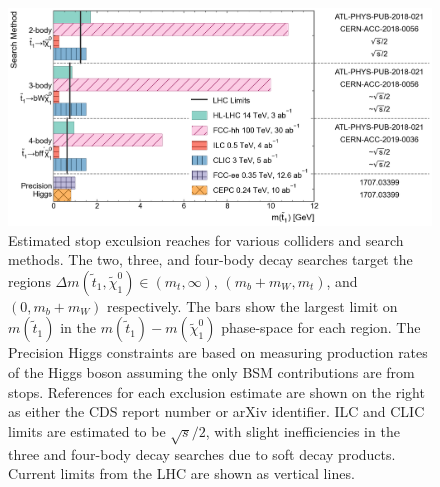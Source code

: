 \documentclass[11pt]{article}
\begin{document}
\begin{figure}
    \centering
    \includegraphics[width=\textwidth]{../img/stop.png}
    \caption{Estimated stop exculsion reaches for various colliders and search methods. 
    The two, three, and four-body decay searches target the regions $\Delta m(\widetilde{t}_1, \widetilde{\chi}_1^0) \in (m_t, \infty)$, $(m_b + m_W, m_t)$, and $(0, m_b + m_W)$ respectively. 
    The bars show the largest limit on $m(\widetilde{t}_1)$ in the $m(\widetilde{t}_1)-m(\widetilde{\chi}_1^0)$ phase-space for each region. 
    The Precision Higgs constraints are based on measuring production rates of the Higgs boson assuming the only BSM contributions are from stops. 
    References for each exclusion estimate are shown on the right as either the CDS report number or arXiv identifier. 
    ILC and CLIC limits are estimated to be $\sqrt{s}/2$, with slight inefficiencies in the three and four-body decay searches due to soft decay products. Current limits from the LHC \cite{ATL-PHYS-PUB-2022-013} are shown as vertical lines. }
\end{figure}
\end{document}
